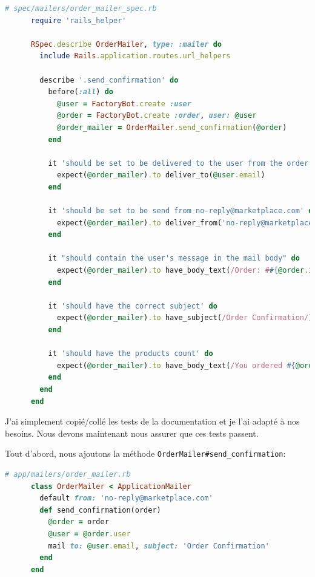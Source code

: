 \documentclass[]{report}
\begin{document}
    \begin{scriptsize}
      \begin{lstlisting}[language=ruby, caption={Test des mails de commande}]
      # spec/mailers/order_mailer_spec.rb
      require 'rails_helper'

      RSpec.describe OrderMailer, type: :mailer do
        include Rails.application.routes.url_helpers

        describe '.send_confirmation' do
          before(:all) do
            @user = FactoryBot.create :user
            @order = FactoryBot.create :order, user: @user
            @order_mailer = OrderMailer.send_confirmation(@order)
          end

          it 'should be set to be delivered to the user from the order passed in' do
            expect(@order_mailer).to deliver_to(@user.email)
          end

          it 'should be set to be send from no-reply@marketplace.com' do
            expect(@order_mailer).to deliver_from('no-reply@marketplace.com')
          end

          it "should contain the user's message in the mail body" do
            expect(@order_mailer).to have_body_text(/Order: ##{@order.id}/)
          end

          it 'should have the correct subject' do
            expect(@order_mailer).to have_subject(/Order Confirmation/)
          end

          it 'should have the products count' do
            expect(@order_mailer).to have_body_text(/You ordered #{@order.products.count} products:/)
          end
        end
      end
      \end{lstlisting}
    \end{scriptsize}

    J'ai simplement copié/collé les tests de la documentation et je l'ai adapté à nos besoins. Nous devons maintenant nous assurer que ces tests passent.

    Tout d'abord, nous ajoutons la méthode \verb|OrderMailer#send_confirmation|:

    \begin{scriptsize}
      \begin{lstlisting}[language=ruby, caption={Implémetation de la méthode pour envoyer un mail lors de la création d'une commande}]
      # app/mailers/order_mailer.rb
      class OrderMailer < ApplicationMailer
        default from: 'no-reply@marketplace.com'
        def send_confirmation(order)
          @order = order
          @user = @order.user
          mail to: @user.email, subject: 'Order Confirmation'
        end
      end
      \end{lstlisting}
    \end{scriptsize}
\end{document}

